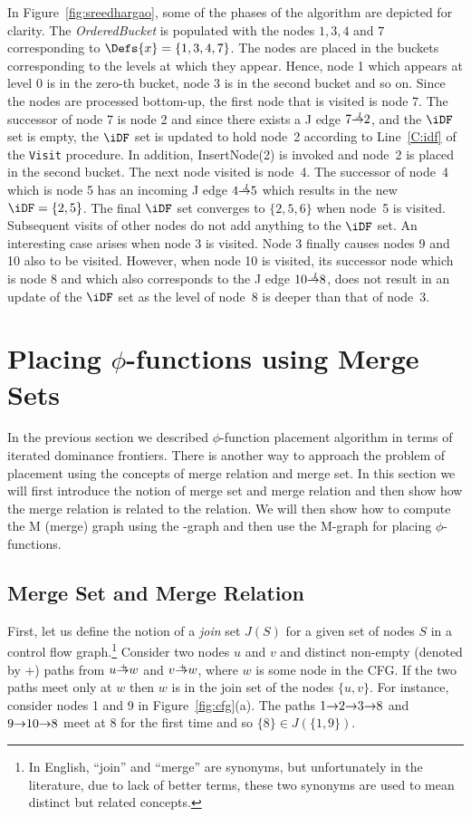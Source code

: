 {In Figure~\ref{fig:sreedhargao}, some of the phases of the algorithm are 
depicted for clarity. The \textit{OrderedBucket}
is populated with the nodes $1,3,4$ and $7$ corresponding to $\Defs{x}=\{1,3,4,7\}$. The nodes are
placed in the buckets corresponding to the levels at which they appear. Hence, node 1 which appears at 
level 0 is in the zero-th bucket, node 3 is in the second bucket and so on. Since the
nodes are processed bottom-up, the first node that is visited is node 7. The successor of node 7 is node
2 and since there exists a J edge $7 \st{J} 2$, and the $\iDF$ set is empty, the $\iDF$ set is updated
to hold node~2 according to Line~\ref{C:idf} of the \texttt{Visit} procedure. In addition, InsertNode(2) is invoked and 
node~2 is placed in the second bucket. The next node visited is node~4. The successor of node~4 which is node
5 has an incoming J edge $4 \st{J} 5$ which results in the new $\iDF = \{2,5\}$. The final $\iDF$ set converges
to $\{2,5,6\}$ when node~5 is visited. Subsequent visits of other nodes do not add anything to the
$\iDF$ set. An interesting case arises when node 3 is visited. Node 3 finally causes nodes 9 and 10 also 
to be visited. However, when node 10 is visited, its successor node which is node 8 and which also 
corresponds to the J edge $10 \st{J} 8$, does not result in an update of the $\iDF$ set as the level of
node~8 is deeper than that of node~3.


\section{Placing $\phi$-functions using Merge Sets}

In the previous section we described $\phi$-function placement algorithm in terms of iterated dominance frontiers. There is another way to approach the problem
of \phifun placement using the concepts of merge relation and merge set. In this section
we will first introduce the notion of merge set and merge relation and then show
how the merge relation is related to the \DF relation. We will then show how to compute
the M (merge) graph using the \DJ-graph and then use the M-graph for placing $\phi$-functions.

\subsection{Merge Set and Merge Relation}

First, let us define the notion of a {\em join} set $J(S)$
 for a given set of nodes  $S$ in a control flow
 graph.\footnote{In English, ``join'' and ``merge'' are synonyms, 
but unfortunately
in the literature, due to lack of  better terms, these two synonyms are used to mean
distinct but related concepts.} Consider two nodes $u$ and $v$ and distinct 
non-empty (denoted by +)
paths from $u \stplus w$ and $v \stplus w$, where $w$ is some node in the CFG. If the 
two paths meet only at $w$ then $w$ is in the join set of the nodes $\{u, v\}$. 
For instance, consider nodes 1 and 9 in Figure~\ref{fig:cfg}(a).
The paths $1 \st{} 2 \st{} 3 \st{} 8$ and $9 \st{} 10 \st{} 8$ meet at $8$ 
for the first time and so $\{8\} \in J(\{1,9\})$. 

}
